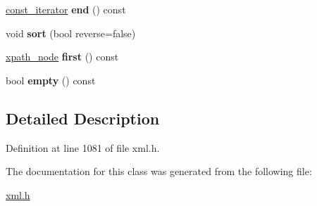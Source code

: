 \begin{DoxyCompactItemize}
\item 
\hypertarget{classphys_1_1xml_1_1xpath__NodeSet_a58752ceafdc50b0d23224f58357258e4}{
\hyperlink{classphys_1_1xml_1_1xpath__node}{const\_\-iterator} {\bfseries end} () const }
\label{dc/d32/classphys_1_1xml_1_1xpath__NodeSet_a58752ceafdc50b0d23224f58357258e4}

\item 
\hypertarget{classphys_1_1xml_1_1xpath__NodeSet_aeb8d93eb1bf07c23cddc9093869fee54}{
void {\bfseries sort} (bool reverse=false)}
\label{dc/d32/classphys_1_1xml_1_1xpath__NodeSet_aeb8d93eb1bf07c23cddc9093869fee54}

\item 
\hypertarget{classphys_1_1xml_1_1xpath__NodeSet_a883e2499559c2c6ee6f6d29e88455442}{
\hyperlink{classphys_1_1xml_1_1xpath__node}{xpath\_\-node} {\bfseries first} () const }
\label{dc/d32/classphys_1_1xml_1_1xpath__NodeSet_a883e2499559c2c6ee6f6d29e88455442}

\item 
\hypertarget{classphys_1_1xml_1_1xpath__NodeSet_adbfc308bf6d0bb44e646256be985a82e}{
bool {\bfseries empty} () const }
\label{dc/d32/classphys_1_1xml_1_1xpath__NodeSet_adbfc308bf6d0bb44e646256be985a82e}

\end{DoxyCompactItemize}


\subsection{Detailed Description}


Definition at line 1081 of file xml.h.



The documentation for this class was generated from the following file:\begin{DoxyCompactItemize}
\item 
\hyperlink{xml_8h}{xml.h}\end{DoxyCompactItemize}
